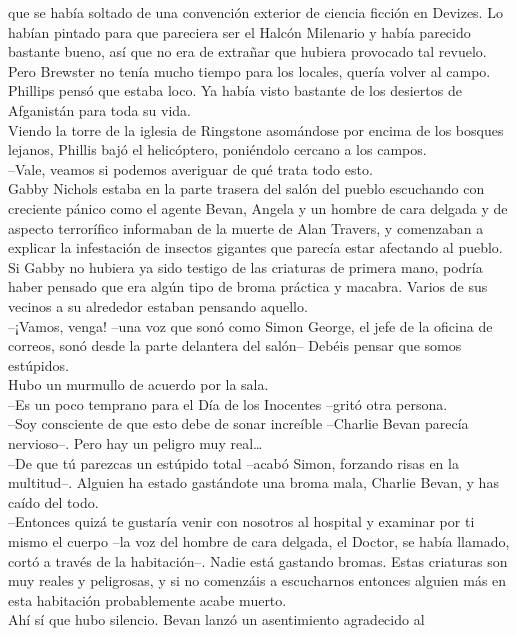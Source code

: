 que se había soltado de una convención exterior de ciencia ficción en
Devizes. Lo habían pintado para que pareciera ser el Halcón Milenario y
había parecido bastante bueno, así que no era de extrañar que hubiera
provocado tal revuelo. Pero Brewster no tenía mucho tiempo para los
locales, quería volver al campo. Phillips pensó que estaba loco. Ya
había visto bastante de los desiertos de Afganistán para toda su vida.\\
Viendo la torre de la iglesia de Ringstone asomándose por encima de los
bosques lejanos, Phillis bajó el helicóptero, poniéndolo cercano a los
campos.\\
--Vale, veamos si podemos averiguar de qué trata todo
esto.\\[2\baselineskip]Gabby Nichols estaba en la parte trasera del
salón del pueblo escuchando con creciente pánico como el agente Bevan,
Angela y un hombre de cara delgada y de aspecto terrorífico informaban
de la muerte de Alan Travers, y comenzaban a explicar la infestación de
insectos gigantes que parecía estar afectando al pueblo.\\
Si Gabby no hubiera ya sido testigo de las criaturas de primera mano,
podría haber pensado que era algún tipo de broma práctica y macabra.
Varios de sus vecinos a su alrededor estaban pensando aquello.\\
--¡Vamos, venga! --una voz que sonó como Simon George, el jefe de la
oficina de correos, sonó desde la parte delantera del salón-- Debéis
pensar que somos estúpidos.\\
Hubo un murmullo de acuerdo por la sala.\\
--Es un poco temprano para el Día de los Inocentes --gritó otra
persona.\\
--Soy consciente de que esto debe de sonar increíble --Charlie Bevan
parecía nervioso--. Pero hay un peligro muy real\ldots{}\\
--De que tú parezcas un estúpido total --acabó Simon, forzando risas en
la multitud--. Alguien ha estado gastándote una broma mala, Charlie
Bevan, y has caído del todo.\\
--Entonces quizá te gustaría venir con nosotros al hospital y examinar
por ti mismo el cuerpo --la voz del hombre de cara delgada, el Doctor,
se había llamado, cortó a través de la habitación--. Nadie está gastando
bromas. Estas criaturas son muy reales y peligrosas, y si no comenzáis a
escucharnos entonces alguien más en esta habitación probablemente acabe
muerto.\\
Ahí sí que hubo silencio. Bevan lanzó un asentimiento agradecido al

